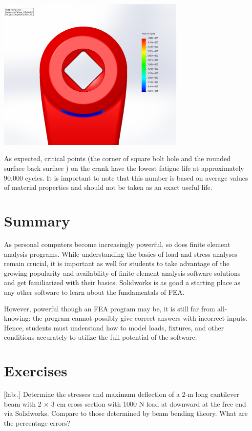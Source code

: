 \documentclass[a4paper,openany,12pt]{book}
\begin{document}
{{\begin{center}
\includegraphics[width=0.7\textwidth]{pictures/Intro-CAD/Crank-fatigue-back.jpg}
\end{center}

As expected, critical points (the corner of square bolt hole and the
rounded surface back surface ) on the crank have the lowest fatigue life
at approximately 90,000 cycles. It is important to note that this number
is based on average values of material properties and should not be
taken as an exact useful life.

\section{Summary}
\label{summary-9}
As personal computers become increasingly powerful, so does finite
element analysis programs. While understanding the basics of load and
stress analyses remain crucial, it is important as well for students to
take advantage of the growing popularity and availability of finite
element analysis software solutions and get familiarized with their
basics. Solidworks is as good a starting place as any other software to
learn about the fundamentals of FEA.

However, powerful though an FEA program may be, it is still far from
all-knowing: the program cannot possibly give correct answers with
incorrect inputs. Hence, students must understand how to model loads,
fixtures, and other conditions accurately to utilize the full potential
of the software.

\section{Exercises}
\label{exercises-9}
[lab:.] Determine the stresses and
maximum deflection of a 2-m long cantilever beam with 2 \(\times\) 3 cm
cross section with 1000 N load at downward at the free end via
Solidworks. Compare to those determined by beam bending theory. What are
the percentage errors?

}}
\end{document}
